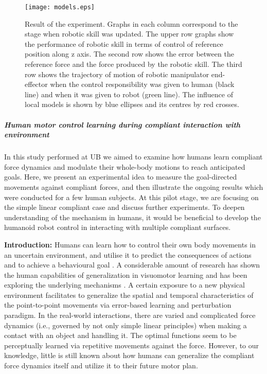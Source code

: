 \begin{figure}[!t]
	\centering
	\texttt{[image: models.eps]}
	\caption{Result of the experiment. Graphs in each column correspond to the stage when robotic skill was updated. The upper row graphs show the performance of robotic skill in terms of control of reference position along z axis. The second row shows the error between the reference force and the force produced by the robotic skill. The third row shows the trajectory of motion of robotic manipulator end-effector when the control responsibility was given to human (black line) and when it was given to robot (green line). The influence of local models is shown by blue ellipses and its centres by red crosses.}
	\label{fig:models}
\end{figure}





\subparagraph{Human motor control learning during compliant interaction with environment}

\newcommand{\BF}{\mathbf{F}}
\newcommand{\BZ}{\mathbf{Z}}
\newcommand{\BA}{\mathbf{A}}
\newcommand{\BB}{\mathbf{B}}
\newcommand{\BC}{\mathbf{C}}
\newcommand{\BD}{\mathbf{D}}

In this study performed at UB we aimed to examine how humans learn compliant force dynamics and
modulate their whole-body motions to reach anticipated goals.  Here, we
present an experimental idea to measure the goal-directed movements against
compliant forces, and then illustrate the ongoing results which were conducted
for a few human subjects.  At this pilot stage, we are focusing on the simple
linear compliant case and discuss further experiments.  To deepen
understanding of the mechanism in humans, it would be beneficial to develop
the humanoid robot control in interacting with multiple compliant surfaces.


\textbf{Introduction:}  Humans can learn how to control their own body movements in an uncertain
environment, and utilise it to predict the consequences of actions and to
achieve a behavioural goal \cite{Wolpert11, Davidson&Wolpert03}.  A
considerable amount of research has shown the human capabilities of
generalization in visuomotor learning and has been exploring the underlying
mechanisms \cite{Goodbody&Wolpert98, Krakauer06}.  A certain exposure to a new
physical environment facilitates to generalize the spatial and temporal
characteristics of the point-to-point movements via error-based learning and
perturbation paradigm. In the real-world interactions, there are varied and
complicated force dynamics (i.e., governed by not only simple linear
principles) when making a contact with an object and handling it. The optimal
functions seem to be perceptually learned via repetitive movements against the
force. However, to our knowledge, little is still known about how humans can
generalize the compliant force dynamics itself and utilize it to their future
motor plan.

